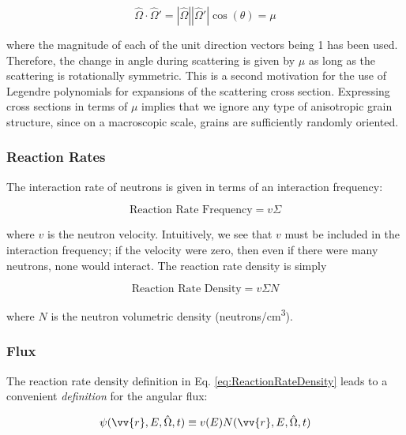 \documentclass[10pt]{article}
\begin{document}
\begin{flushleft}
\begin{equation}
\label{eq:OmegaDotOmega}
\hat{\Omega}\cdot\hat{\Omega}' = |\hat{\Omega}||\hat{\Omega}'| \cos{(\theta)} = \mu
\end{equation} 

where the magnitude of each of the unit direction vectors being 1 has been used. Therefore, the change in angle during scattering is given by \(\mu\) as long as the scattering is rotationally symmetric. This is a second motivation for the use of Legendre polynomials for expansions of the scattering cross section. Expressing cross sections in terms of \(\mu\) implies that we ignore any type of anisotropic grain structure, since on a macroscopic scale, grains are sufficiently randomly oriented. 

\subsubsection{Reaction Rates}

The interaction rate of neutrons is given in terms of an interaction frequency:

\begin{equation}
\label{eq:ReactionFrequency}
\textrm{Reaction Rate Frequency} = v\Sigma
\end{equation}

where \(v\) is the neutron velocity. Intuitively, we see that \(v\) must be included in the interaction frequency; if the velocity were zero, then even if there were many neutrons, none would interact. The reaction rate density is simply

\begin{equation}
\label{eq:ReactionRateDensity}
\textrm{Reaction Rate Density} = v\Sigma N
\end{equation}

where \(N\) is the neutron volumetric density (neutrons/cm\textsuperscript{3}). 

\subsubsection{Flux}

The reaction rate density definition in Eq. \ref{eq:ReactionRateDensity} leads to a convenient \textit{definition} for the angular flux:

\begin{equation}
\label{eq:AngularFlux}
\psi(\vv{r}, E, \hat{\Omega}, t) \equiv v(E)N(\vv{r}, E, \hat{\Omega}, t)
\end{equation}


\end{flushleft}
\end{document}
